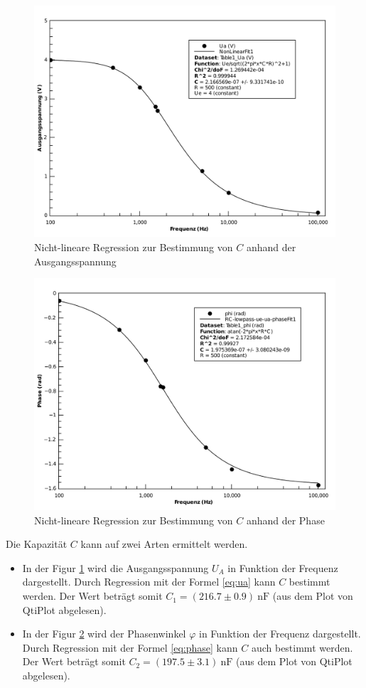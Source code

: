 \begin{figure}[H]
    \center
    \includegraphics[width=.8\textwidth]{qtiplot/rc-ua}
    \caption{Nicht-lineare Regression zur Bestimmung von $C$ anhand der Ausgangsspannung}
    \label{fig:rc-ua}
\end{figure}

\begin{figure}[H]
    \center
    \includegraphics[width=.8\textwidth]{qtiplot/rc-phase}
    \caption{Nicht-lineare Regression zur Bestimmung von $C$ anhand der Phase}
    \label{fig:rc-phase}
\end{figure}


Die Kapazit\"at $C$ kann auf zwei Arten ermittelt werden.

\begin{itemize}
    \item In der Figur \ref{fig:rc-ua} wird die Ausgangsspannung $U_A$ in Funktion der Frequenz dargestellt.
    Durch Regression mit der Formel \ref{eq:ua} kann $C$ bestimmt werden. Der Wert betr\"agt somit
    $C_1 = (216.7 \pm 0.9)\SI{}{\nano\farad}$ (aus dem Plot von QtiPlot
    abgelesen).

    \item In der Figur \ref{fig:rc-phase} wird der Phasenwinkel $\varphi$ in Funktion der Frequenz dargestellt.
    Durch Regression mit der Formel \ref{eq:phase} kann $C$ auch bestimmt werden. Der Wert betr\"agt
    somit $C_2 = (197.5 \pm 3.1)\SI{}{\nano\farad}$ (aus dem Plot von
    QtiPlot abgelesen).
\end{itemize}


